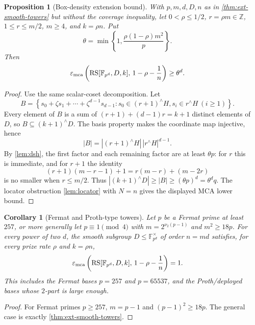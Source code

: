 \documentclass[11pt]{article}
\newtheorem{proposition}[proposition]{Proposition}
\newtheorem{corollary}[corollary]{Corollary}
\theoremstyle{definition}
\newcommand{\F}{\mathbb F}
\newcommand{\Z}{\mathbb Z}
\newcommand{\RS}{\operatorname{RS}}
\newcommand{\eps}{\varepsilon}
\newcommand{\vtwo}{\nu_2}
\begin{document}
\begin{proposition}[Box-density extension bound]\label{prop:ext-density}
With $p,m,d,D,n$ as in \cref{thm:ext-smooth-towers} but without the coverage inequality, let $0<\rho\le1/2$, $r=\rho m\in\Z$, $1\le r\le m/2$, $m\ge4$, and $k=\rho n$.  Put
\[
        \theta=\min\left\{1,\frac{\rho(1-\rho)m^2}{p}\right\}.
\]
Then
\[
        \eps_{\rm mca}\left(\RS[\F_{p^d},D,k],\,1-\rho-\frac1n\right)\ge\theta^d.
\]
\end{proposition}

\begin{proof}
Use the same scalar-coset decomposition.  Let
\[
        B=\left\{s_0+\zeta s_1+\cdots+\zeta^{d-1}s_{d-1}:
        s_0\in(r+1)^{\wedge}H,
        s_i\in r^{\wedge}H\ (i\ge1)\right\}.
\]
Every element of $B$ is a sum of $(r+1)+(d-1)r=k+1$ distinct elements of $D$, so $B\subseteq(k+1)^{\wedge}D$.  The basis property makes the coordinate map injective, hence
\[
        |B|=|(r+1)^{\wedge}H|\,|r^{\wedge}H|^{d-1}.
\]
By \cref{lem:dsh}, the first factor and each remaining factor are at least $\theta p$: for $r$ this is immediate, and for $r+1$ the identity
\[
        (r+1)(m-r-1)+1=r(m-r)+(m-2r)
\]
is no smaller when $r\le m/2$.  Thus $|(k+1)^{\wedge}D|\ge |B|\ge(\theta p)^d=\theta^d q$.  The locator obstruction \cref{lem:locator} with $N=n$ gives the displayed MCA lower bound.
\end{proof}

\begin{corollary}[Fermat and Proth-type towers]\label{cor:fermat-proth-towers}
Let $p$ be a Fermat prime at least $257$, or more generally let $p\equiv1\pmod4$ with $m=2^{\vtwo(p-1)}$ and $m^2\ge18p$.  For every power of two $d$, the smooth subgroup $D\le\F_{p^d}^{\times}$ of order $n=md$ satisfies, for every prize rate $\rho$ and $k=\rho n$,
\[
        \eps_{\rm mca}\left(\RS[\F_{p^d},D,k],\,1-\rho-\frac1n\right)=1.
\]
This includes the Fermat bases $p=257$ and $p=65537$, and the Proth/deployed bases whose $2$-part is large enough.
\end{corollary}

\begin{proof}
For Fermat primes $p\ge257$, $m=p-1$ and $(p-1)^2\ge18p$.  The general case is exactly \cref{thm:ext-smooth-towers}.
\end{proof}
\end{document}
